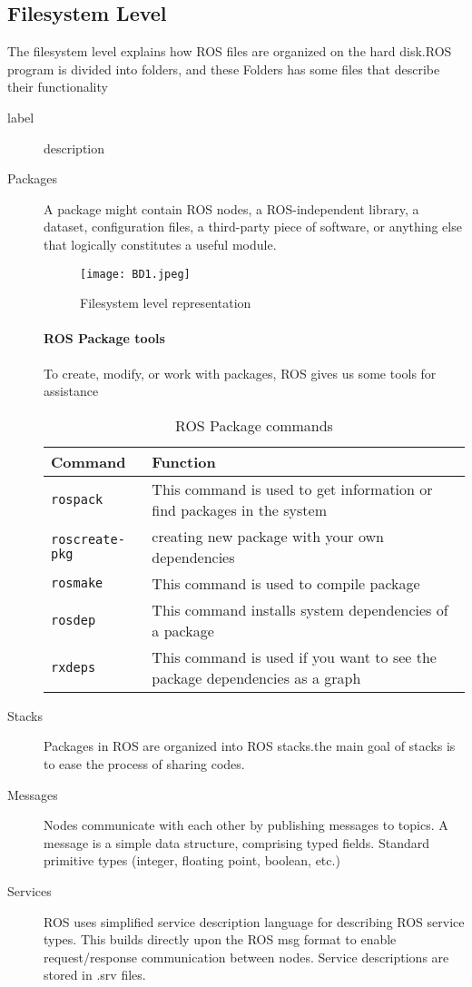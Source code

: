 	\subsection{Filesystem Level}
The filesystem level explains how ROS files are organized on the hard disk.ROS program is divided into folders, and these Folders has some files that describe their functionality


\begin{description}
    \item[label] description
\end{description}
 		 \begin{description}
  			\item [Packages]
  				A package might contain ROS nodes, a ROS-independent library, a dataset, configuration files, a third-party piece of software, or anything else that logically constitutes a useful module.
  	\begin{figure}[ht]
  		\centering
  		\caption{Filesystem level representation}
  		\texttt{[image: BD1.jpeg]}
  	\end{figure}
  			\paragraph{ROS Package tools }
  	To create, modify, or work with packages, ROS gives us some tools for assistance
  	\begin{table}[H]
  		\centering
  	\begin{tabular}{| p{3cm} |p{8cm}|}\hline
          Command  &  Function\\\hline\hline
          \texttt{rospack}  &  This command is used to get information or find packages in the system\\\hline
           \texttt{roscreate-pkg} & creating new package with your own dependencies \\\hline
           \texttt{rosmake} &  This command is used to compile package\\\hline
           \texttt{rosdep} &  This command installs system dependencies of a package\\\hline 
           \texttt{rxdeps} &  This command is used if you want to see the package dependencies as a graph\\\hline 
      \end{tabular}
  		\caption{ROS Package commands}
  		\label{table:2}
  	\end{table}
 \item [Stacks]
 Packages in ROS are organized into ROS stacks.the main goal of stacks is to ease the process of sharing codes.
 \item [Messages]
 Nodes communicate with each other by publishing messages to topics. A message is a simple data structure, comprising typed fields. Standard primitive types (integer, floating point, boolean, etc.)
 \item [Services]
 ROS uses simplified service description language for describing ROS service types. This builds directly upon the ROS msg format to enable request/response communication between nodes. Service descriptions are stored in .srv files. 
\end{description}

